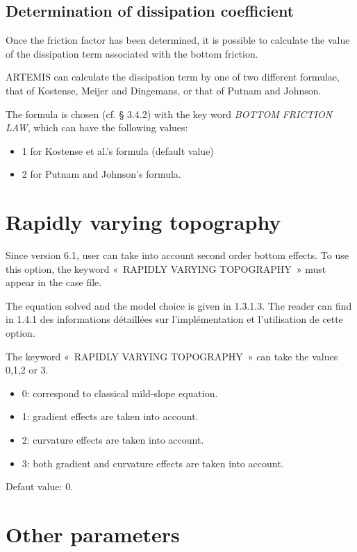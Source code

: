 \subsection{Determination of dissipation coefficient}

Once the friction factor has been determined, it is possible to calculate the
value of the dissipation term associated with the bottom friction.

ARTEMIS can calculate the dissipation term by one of two different formulae,
that of Kostense, Meijer and Dingemans, or that of Putnam and Johnson.

The formula is chosen (cf. {\S} 3.4.2) with the key word \textit{BOTTOM
FRICTION LAW}, which can have the following values:

\begin{itemize}
\item  1 for Kostense et al.'s formula (default value)

\item  2 for Putnam and Johnson's formula.
\end{itemize}


\section{Rapidly varying topography}

Since version 6.1, user can take into account second order bottom effects. To
use this option, the keyword «~RAPIDLY VARYING TOPOGRAPHY~» must appear in the
case file.

The equation solved and the model choice is given in 1.3.1.3. The reader can
find in 1.4.1 des informations d\'{e}taill\'{e}es sur l'impl\'{e}mentation et
l'utilisation de cette option.

The keyword «~RAPIDLY VARYING TOPOGRAPHY~» can take the values 0,1,2 or 3.
\begin{itemize}
  \item 0: correspond to classical mild-slope equation.
  \item 1: gradient effects are taken into account.
  \item 2: curvature effects are taken into account.
  \item 3: both gradient
and curvature effects are taken into account.
\end{itemize}

Defaut value: 0.

\section{Other parameters}


